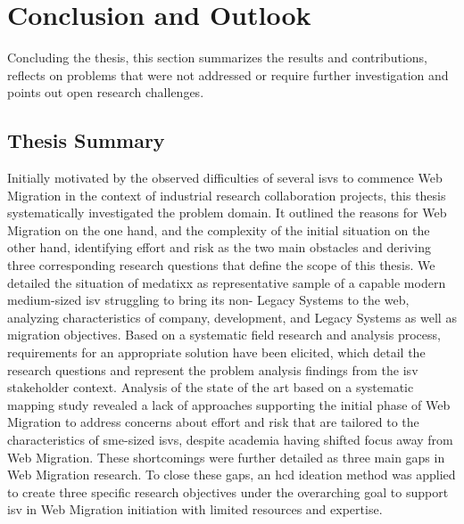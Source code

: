 \hypertarget{sec:conclusion}{%
\chapter{Conclusion and Outlook}\label{sec:conclusion}}

Concluding the thesis, this section summarizes the results and contributions, reflects on problems that were not addressed or require further investigation and points out open research challenges.

\vspace{-15pt}
\hypertarget{thesis-summary}{%
\section{Thesis Summary}\label{thesis-summary}}
\vspace{15pt}

Initially motivated by the observed difficulties of several \glspl{isv} to commence \gls{Web Migration} in the context of industrial research collaboration projects, this thesis systematically investigated the problem domain.
It outlined the reasons for \gls{Web Migration} on the one hand, and the complexity of the initial  situation on the other hand, identifying effort and risk as the two main obstacles and deriving three corresponding research questions that define the scope of this thesis.
We detailed the situation of medatixx as representative sample of a capable modern medium-sized \gls{isv} struggling to bring its non- \glspl{Legacy System} to the \gls{web}, analyzing characteristics of company, development, and \glspl{Legacy System} as well as migration objectives.
Based on a systematic field research and analysis process, requirements for an appropriate solution have been elicited, which detail the research questions and represent the problem analysis findings from the \gls{isv} stakeholder context.
Analysis of the state of the art based on a systematic mapping study revealed a lack of approaches supporting the initial phase of \gls{Web Migration} to address concerns about effort and risk that are tailored to the characteristics of \gls{sme}-sized \glspl{isv}, despite academia having shifted focus away from \gls{Web Migration}.
These shortcomings were further detailed as three main gaps in \gls{Web Migration} research.
To close these gaps, an \gls{hcd} ideation method was applied to create three specific research objectives under the overarching goal to support \gls{isv} in \gls{Web Migration} initiation with limited resources and expertise.

